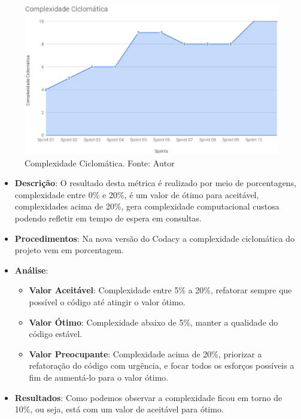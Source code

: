
\begin{figure}[h!]
	\centering
  \includegraphics[keepaspectratio=true,scale=0.5]{figuras/complexidade_ciclomatica.eps}
  \caption[Complexidade Ciclomática.]{Complexidade Ciclomática. Fonte: Autor}
	\label{fig:complexidade}
\end{figure}

\begin{itemize}
  \item \textbf{Descrição}: O resultado desta métrica é realizado por meio de porcentagens, complexidade entre 0\% e 20\%, é um valor de ótimo para aceitável, complexidades acima de 20\%, gera complexidade computacional custosa podendo refletir em tempo de espera em consultas.
  \item \textbf{Procedimentos}: Na nova versão do Codacy a complexidade ciclomática do projeto vem em porcentagem.
  \item \textbf{Análise}:
    \begin{itemize}
      \item \textbf{Valor Aceitável}: Complexidade entre 5\% a 20\%, refatorar sempre que possível o código até atingir o valor ótimo.
      \item \textbf{Valor Ótimo}: Complexidade abaixo de 5\%, manter a qualidade do código estável.
      \item \textbf{Valor Preocupante}: Complexidade acima de 20\%, priorizar a refatoração do código com urgência, e focar todos os esforços possíveis a fim de aumentá-lo para o valor ótimo.
    \end{itemize}
  \item \textbf{Resultados}: Como podemos observar a complexidade ficou em torno de 10\%, ou seja, está com um valor de aceitável para ótimo.
\end{itemize}

